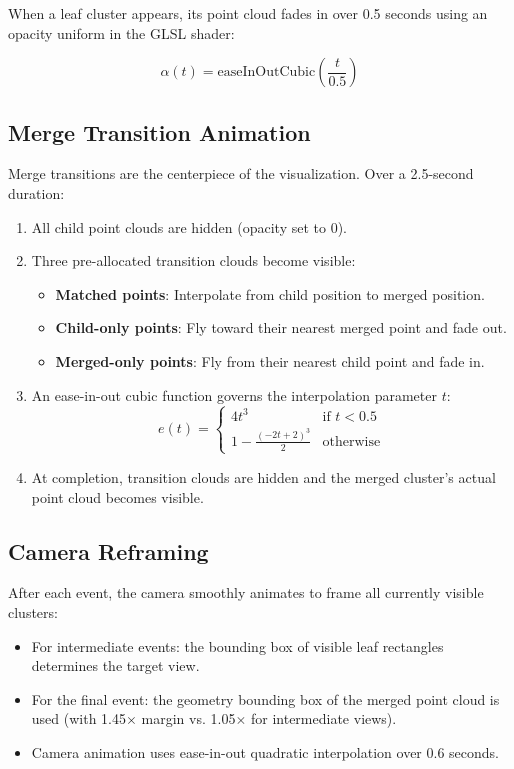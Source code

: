 \documentclass[11pt, letterpaper]{article}
\begin{document}
When a leaf cluster appears, its point cloud fades in over 0.5 seconds using an opacity uniform in the GLSL shader:

\begin{equation}
    \alpha(t) = \text{easeInOutCubic}\left(\frac{t}{0.5}\right)
\end{equation}

\subsection{Merge Transition Animation}

Merge transitions are the centerpiece of the visualization. Over a 2.5-second duration:

\begin{enumerate}
    \item All child point clouds are hidden (opacity set to 0).
    \item Three pre-allocated transition clouds become visible:
    \begin{itemize}
        \item \textbf{Matched points}: Interpolate from child position to merged position.
        \item \textbf{Child-only points}: Fly toward their nearest merged point and fade out.
        \item \textbf{Merged-only points}: Fly from their nearest child point and fade in.
    \end{itemize}
    \item An ease-in-out cubic function governs the interpolation parameter $t$:
    \begin{equation}
        e(t) = \begin{cases} 4t^3 & \text{if } t < 0.5 \\ 1 - \frac{(-2t + 2)^3}{2} & \text{otherwise} \end{cases}
    \end{equation}
    \item At completion, transition clouds are hidden and the merged cluster's actual point cloud becomes visible.
\end{enumerate}

\subsection{Camera Reframing}

After each event, the camera smoothly animates to frame all currently visible clusters:
\begin{itemize}
    \item For intermediate events: the bounding box of visible leaf rectangles determines the target view.
    \item For the final event: the geometry bounding box of the merged point cloud is used (with 1.45$\times$ margin vs. 1.05$\times$ for intermediate views).
    \item Camera animation uses ease-in-out quadratic interpolation over 0.6 seconds.
\end{itemize}
\end{document}
